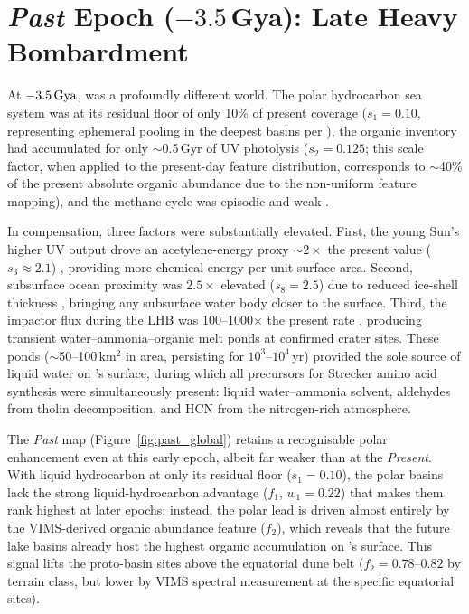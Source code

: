 \section{\textit{Past} Epoch ($-3.5$\,Gya): Late Heavy Bombardment}
\label{sec:results_past}

At $-3.5\,\text{Gya}$, \titan{} was a profoundly different world.  The polar hydrocarbon sea system was at its residual floor of only 10\% of present coverage ($s_1 = 0.10$, representing ephemeral pooling in the deepest basins per \citealt{Tobie2006}), the organic inventory had accumulated for only $\sim$0.5\,Gyr of UV photolysis ($s_2 = 0.125$; this scale factor, when applied to the present-day feature distribution, corresponds to $\sim$40\% of the present absolute organic abundance due to the non-uniform feature mapping), and the methane cycle was episodic and weak \citep{Tobie2006,Strobel2010}.

In compensation, three factors were substantially elevated.  First, the young Sun's higher UV output drove an acetylene-energy proxy $\sim$$2\times$ the present value ($s_3 \approx 2.1$) \citep{Bahcall2001,Lavvas2011}, providing more chemical energy per unit surface area.  Second, subsurface ocean proximity was $2.5\times$ elevated ($s_8 = 2.5$) due to reduced ice-shell thickness \citep{Tobie2005,Nimmo2010}, bringing any subsurface water body closer to the surface.  Third, the impactor flux during the LHB was 100--1000$\times$ the present rate \citep{OBrien2005}, producing transient water--ammonia--organic melt ponds at confirmed crater sites.  These ponds ($\sim$50--100\,km$^2$ in area, persisting for $10^3$--$10^4$\,yr) provided the sole source of liquid water on \titan{}'s surface, during which all precursors for Strecker amino acid synthesis were simultaneously present: liquid water--ammonia solvent, aldehydes from tholin decomposition, and HCN from the nitrogen-rich atmosphere.

The \textit{Past} map (Figure~\ref{fig:past_global}) retains a recognisable polar enhancement even at this early epoch, albeit far weaker than at the \textit{Present}.  With liquid hydrocarbon at only its residual floor ($s_1 = 0.10$), the polar basins lack the strong liquid-hydrocarbon advantage ($f_1$, $w_1 = 0.22$) that makes them rank highest at later epochs; instead, the polar lead is driven almost entirely by the VIMS-derived organic abundance feature ($f_2$), which reveals that the future lake basins already host the highest organic accumulation on \titan{}'s surface.  This signal lifts the proto-basin sites above the equatorial dune belt ($f_2 = 0.78$--$0.82$ by terrain class, but lower by VIMS spectral measurement at the specific equatorial sites).

